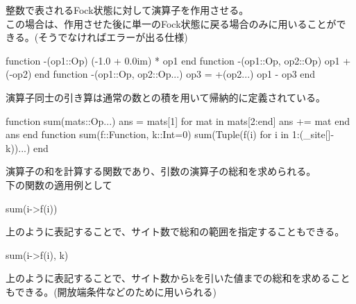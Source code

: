 \documentclass{ltjsarticle}
\begin{document}
整数で表されるFock状態に対して演算子を作用させる。\\
この場合は、作用させた後に単一のFock状態に戻る場合のみに用いることができる。(そうでなければエラーが出る仕様)
\begin{jllisting}
function -(op1::Op)
  (-1.0 + 0.0im) * op1
end
function -(op1::Op, op2::Op)
  op1 + (-op2)
end
function -(op1::Op, op2::Op...)
  op3 = +(op2...)
  op1 - op3
end
\end{jllisting}
演算子同士の引き算は通常の数との積を用いて帰納的に定義されている。
\begin{jllisting}
function sum(mats::Op...)
  ans = mats[1]
  for mat in mats[2:end]
    ans += mat
  end
  ans
end
function sum(f::Function, k::Int=0)
  sum(Tuple(f(i) for i in 1:(_site[]-k))...)
end
\end{jllisting}
演算子の和を計算する関数であり、引数の演算子の総和を求められる。\\
下の関数の適用例として
\begin{jllisting}
sum(i->f(i))
\end{jllisting}
上のように表記することで、サイト数で総和の範囲を指定することもできる。\\
\begin{jllisting}
sum(i->f(i), k)
\end{jllisting}
上のように表記することで、サイト数からkを引いた値までの総和を求めることもできる。(開放端条件などのために用いられる)\\
\end{document}
